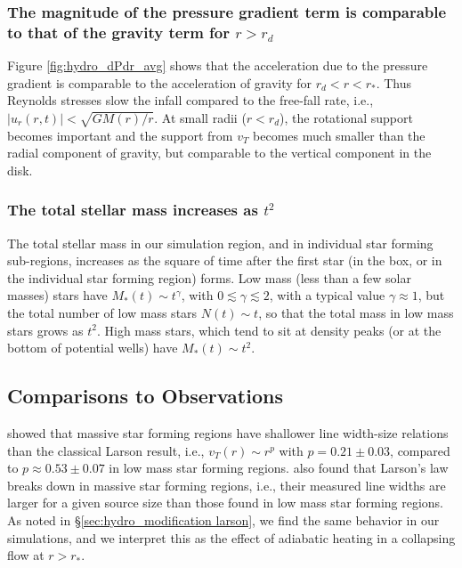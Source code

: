\documentclass[../dissertation.tex]{subfiles}
\begin{document}
\subsubsection{The magnitude of the pressure gradient term is comparable to that 
of the gravity term for $r>r_d$}

Figure \ref{fig:hydro_dPdr_avg} shows that the 
acceleration due to the pressure gradient is comparable to the 
acceleration of gravity for $r_d<r<r_*$. 
Thus Reynolds stresses slow the infall compared to the free-fall rate, i.e., $|u_r(r,t)|< \sqrt{GM(r)/r}$.  
At small radii ($r<r_d$), the rotational support becomes important and 
the support from $v_T$ becomes much smaller than the radial component
of gravity, but comparable to the vertical component in the disk.

\subsubsection{The total stellar mass increases as $t^2$}

The total stellar mass in our simulation region, and in individual star forming
sub-regions, increases as the square of time after the first star (in the box,
or in the individual star forming region) forms.
%
Low mass (less than a few solar masses) stars have $M_*(t)\sim t^\gamma$, with
$0\lesssim\gamma\lesssim 2$, with a typical value $\gamma\approx1$, but the total 
number of low mass stars
 $N(t)\sim t$, so that the total mass in low mass stars grows as $t^2$. High 
mass stars, which tend to sit at density peaks (or at the bottom of potential
 wells) have $M_*(t)\sim t^2$.

\subsection{Comparisons to Observations}

\citet{1995ApJ...446..665C} showed that massive star forming regions have shallower 
line width-size relations than the classical Larson result, i.e., $v_T(r)\sim r^p$ 
with $p= 0.21\pm 0.03$, compared to $p\approx0.53\pm 0.07$ in low mass star 
forming regions. \citet{1997ApJ...476..730P} also found that Larson's law breaks 
down in massive star forming regions, i.e., their measured line widths are 
larger for a given source size than those found in low mass star forming regions.
As noted in \S \ref{sec:hydro_modification larson}, we find the same behavior in our
simulations, and we interpret this as the effect of adiabatic heating in a 
collapsing flow at $r>r_*$. 
\end{document}
